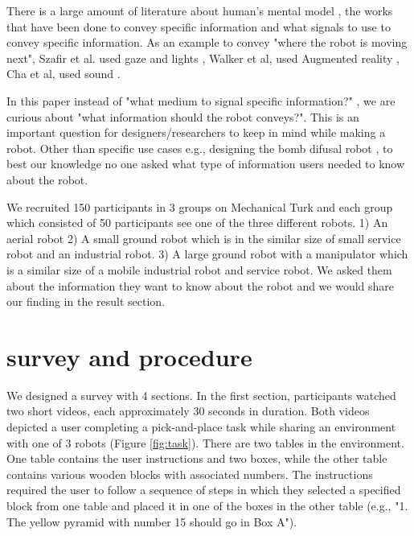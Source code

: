 \documentclass[letterpaper, 10 pt, conference]{ieeeconf}  %
\begin{document}
There is a large amount of literature about human's mental model \cite{aggarwal2011human}, the works that have been done to convey specific information \cite{ arras2005we, bauer2008human} and what signals to use to convey specific information\cite{cha2018survey}. As an example to convey "where the robot is moving next", Szafir et al. used gaze and lights \cite{szafir2015communicating}, Walker et al, used Augmented reality \cite{walker2018communicating}, Cha et al, used sound \cite{cha2018effects}. 

In this paper instead of "what medium to signal specific information?" , we are curious about "what information should the robot conveys?". This is an important question for designers/researchers to keep in mind while making a robot. Other than specific use cases e.g., designing the bomb difusal robot \cite{adams2005human}, to best our knowledge no one asked what type of information users needed to know about the robot.

We recruited 150 participants in 3 groups on Mechanical Turk and each group which consisted of 50 participants see one of the three different robots. 1) An aerial robot 2) A small ground robot which is in the similar size of small service robot and an industrial robot. 3) A large ground robot with a manipulator which is a similar size of a mobile industrial robot and service robot. We asked them about the information they want to know about the robot and we would share our finding in the result section.

\section{survey and procedure}
    We designed a survey with 4 sections. In the first section, participants watched two short videos, each approximately 30 seconds in duration. Both videos depicted a user completing a pick-and-place task while sharing an environment with one of 3 robots (Figure \ref{fig:task}). There are two tables in the environment. One table contains the user instructions and two boxes, while the other table contains various wooden blocks with associated numbers. The instructions required the user to follow a sequence of steps in which they selected a specified block from one table and placed it in one of the boxes in the other table (e.g., "1. The yellow pyramid with number 15 should go in Box A"). 
    
\end{document}
